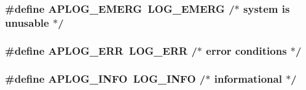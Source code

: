 \subsubsection[{\texorpdfstring{A\+P\+L\+O\+G\+\_\+\+E\+M\+E\+RG}{APLOG_EMERG}}]{\setlength{\rightskip}{0pt plus 5cm}\#define A\+P\+L\+O\+G\+\_\+\+E\+M\+E\+RG~L\+O\+G\+\_\+\+E\+M\+E\+RG       /$\ast$ {\bf system} {\bf is} unusable $\ast$/}\hypertarget{group__APACHE__CORE__LOG_gaa3d7894cd601f48a041689fc21de303d}{}\label{group__APACHE__CORE__LOG_gaa3d7894cd601f48a041689fc21de303d}
\subsubsection[{\texorpdfstring{A\+P\+L\+O\+G\+\_\+\+E\+RR}{APLOG_ERR}}]{\setlength{\rightskip}{0pt plus 5cm}\#define A\+P\+L\+O\+G\+\_\+\+E\+RR~L\+O\+G\+\_\+\+E\+RR         /$\ast$ {\bf error} conditions $\ast$/}\hypertarget{group__APACHE__CORE__LOG_ga57ad94ed8c92c4306de90479251a5d58}{}\label{group__APACHE__CORE__LOG_ga57ad94ed8c92c4306de90479251a5d58}
\subsubsection[{\texorpdfstring{A\+P\+L\+O\+G\+\_\+\+I\+N\+FO}{APLOG_INFO}}]{\setlength{\rightskip}{0pt plus 5cm}\#define A\+P\+L\+O\+G\+\_\+\+I\+N\+FO~L\+O\+G\+\_\+\+I\+N\+FO        /$\ast$ informational $\ast$/}\hypertarget{group__APACHE__CORE__LOG_ga47fafbef7e478babdd92e90407f95b19}{}\label{group__APACHE__CORE__LOG_ga47fafbef7e478babdd92e90407f95b19}
